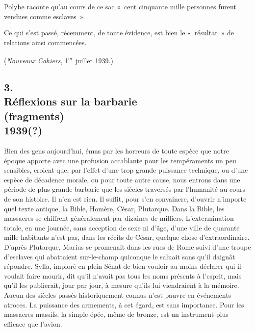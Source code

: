 \documentclass[french,twoside]{book} %
\begin{document}
Polybe raconte qu'au cours de ce sac « cent cinquante mille personnes furent vendues comme esclaves ».\par
Ce qui s'est passé, récemment, de toute évidence, est bien le « résultat » de relations ainsi commencées.\par
({\itshape Nouveaux Cahiers}, 1\textsuperscript{er} juillet 1939.)\par

\begin{center}
\noindent \centerline{}
\end{center}

\subsection[{3. Réflexions sur la barbarie, (fragments) 1939(?)}]{3. \\
Réflexions sur la barbarie \\
(fragments) \\
1939(?)}
\noindent \par
Bien des gens aujourd'hui, émus par les horreurs de toute espèce que notre époque apporte avec une profusion accablante pour les tempéraments un peu sensibles, croient que, par l'effet d'une trop grande puissance technique, ou d'une espèce de décadence morale, ou pour toute autre cause, nous entrons dans une période de plus grande barbarie que les siècles traversés par l'huma­nité au cours de son histoire. Il n'en est rien. Il suffit, pour s'en convaincre, d'ouvrir n'importe quel texte antique, la Bible, Homère, César, Plutarque. Dans la Bible, les massacres se chiffrent généralement par dizaines de milliers. L'extermination totale, en une journée, sans acception de sexe ni d'âge, d'une ville de quarante mille habitants n'est pas, dans les récits de César, quelque chose d'extraordinaire. D'après Plutarque, Marius se promenait dans les rues de Rome suivi d'une troupe d'esclaves qui abattaient sur-le-champ quiconque le saluait sans qu'il daignât répondre. Sylla, imploré en plein Sénat de bien vouloir au moins déclarer qui il voulait faire mourir, dit qu'il n'avait pas tous les noms présents à l'esprit, mais qu'il les publierait, jour par jour, à mesure qu'ils lui viendraient à la mémoire. Aucun des siècles passés historiquement connus n'est pauvre en événements atroces. La puissance des armements, à cet égard, est sans importance. Pour les massacres massifs, la simple épée, même de bronze, est un instrument plus efficace que l'avion.\par
\end{document}
